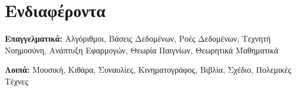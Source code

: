 \documentclass[print]{keros-cv} %
\begin{document}
\section{Ενδιαφέροντα}

\textbf{Επαγγελματικά:} Αλγόριθμοι, Βάσεις Δεδομένων, Ροές Δεδομένων, Τεχνητή Νοημοσύνη, Ανάπτυξη Εφαρμογών, Θεωρία Παιγνίων, Θεωρητικά Μαθηματικά

\textbf{Λοιπά:} Μουσική, Κιθάρα, Συναυλίες, Κινηματογράφος, Βιβλία, Σχέδιο, Πολεμικές Τέχνες

%
%
%
%
%
%
%

\end{document}
